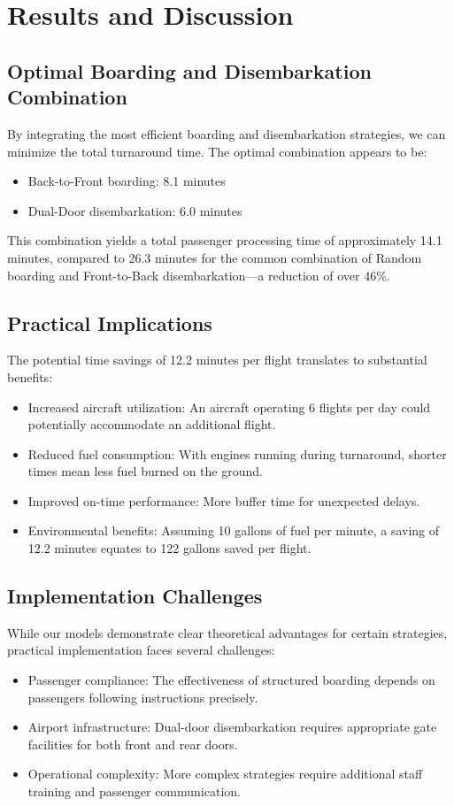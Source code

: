 \documentclass[12pt,a4paper]{article}
\begin{document}
\section{Results and Discussion}

\subsection{Optimal Boarding and Disembarkation Combination}
By integrating the most efficient boarding and disembarkation strategies, we can minimize the total turnaround time. The optimal combination appears to be:
\begin{itemize}
    \item Back-to-Front boarding: 8.1 minutes
    \item Dual-Door disembarkation: 6.0 minutes
\end{itemize}

This combination yields a total passenger processing time of approximately 14.1 minutes, compared to 26.3 minutes for the common combination of Random boarding and Front-to-Back disembarkation—a reduction of over 46\%.

\subsection{Practical Implications}
The potential time savings of 12.2 minutes per flight translates to substantial benefits:
\begin{itemize}
    \item Increased aircraft utilization: An aircraft operating 6 flights per day could potentially accommodate an additional flight.
    \item Reduced fuel consumption: With engines running during turnaround, shorter times mean less fuel burned on the ground.
    \item Improved on-time performance: More buffer time for unexpected delays.
    \item Environmental benefits: Assuming 10 gallons of fuel per minute, a saving of 12.2 minutes equates to 122 gallons saved per flight.
\end{itemize}

\subsection{Implementation Challenges}
While our models demonstrate clear theoretical advantages for certain strategies, practical implementation faces several challenges:
\begin{itemize}
    \item Passenger compliance: The effectiveness of structured boarding depends on passengers following instructions precisely.
    \item Airport infrastructure: Dual-door disembarkation requires appropriate gate facilities for both front and rear doors.
    \item Operational complexity: More complex strategies require additional staff training and passenger communication.
\end{itemize}
\end{document}
